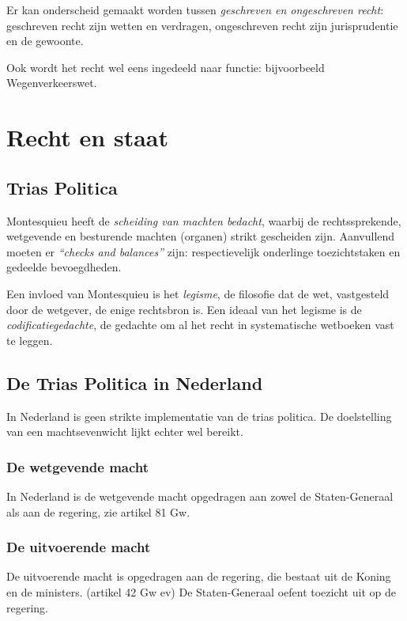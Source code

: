 \documentclass{article}
\begin{document}
Er kan onderscheid gemaakt worden tussen \emph{geschreven en ongeschreven recht}:
geschreven recht zijn wetten en verdragen, ongeschreven recht zijn
jurisprudentie en de gewoonte.

Ook wordt het recht wel eens ingedeeld naar functie: bijvoorbeeld
Wegenverkeerswet.

\section{Recht en staat}
\label{h2}

\subsection{Trias Politica}

Montesquieu heeft de \emph{scheiding van machten bedacht}, waarbij de
rechtssprekende, wetgevende en besturende machten (organen) strikt gescheiden
zijn. Aanvullend moeten er \emph{``checks and balances''} zijn: respectievelijk
onderlinge toezichtstaken en gedeelde bevoegdheden.

Een invloed van Montesquieu is het \emph{legisme}, de filosofie dat de wet,
vastgesteld door de wetgever, de enige rechtsbron is. Een ideaal van het
legisme is de \emph{codificatiegedachte}, de gedachte om al het recht in
systematische wetboeken vast te leggen.

\subsection{De Trias Politica in Nederland}

In Nederland is geen strikte implementatie van de trias politica. De
doelstelling van een machtsevenwicht lijkt echter wel bereikt.

\subsubsection{De wetgevende macht}

In Nederland is de wetgevende macht opgedragen aan zowel de Staten-Generaal
als aan de regering, zie artikel 81 Gw.

\subsubsection{De uitvoerende macht}

De uitvoerende macht is opgedragen aan de regering, die bestaat uit de Koning
en de ministers. (artikel 42 Gw ev) De Staten-Generaal oefent toezicht uit op
de regering.
\end{document}
